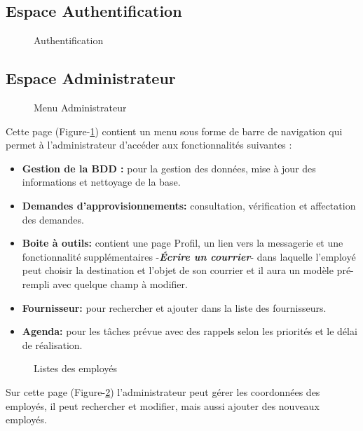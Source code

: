 \documentclass{report}
\begin{document}
\subsection{Espace Authentification}

\begin{figure}[h]
        \centering
        \caption{Authentification}
\end{figure}


\newpage
\subsection{Espace Administrateur}
\begin{figure}[h]
        \centering
        \caption{Menu Administrateur}
        \label{1}
\end{figure}
\vspace{1cm}
Cette page (Figure-\ref{1}) contient un menu sous forme de barre de navigation qui permet à l’administrateur d’accéder aux fonctionnalités suivantes :\\
\begin{itemize}
    \item \textbf{Gestion de la BDD :} pour la gestion des données, mise à jour des informations et nettoyage de la base.\\
    \item \textbf{Demandes d'approvisionnements:} consultation, vérification et affectation des demandes.\\
    \item \textbf{Boite à outils:} contient une page Profil, un lien vers la messagerie et une fonctionnalité supplémentaires -\textbf{\emph{Écrire un courrier}}- dans laquelle l’employé peut choisir la destination et l’objet de son courrier et il aura un modèle pré-rempli avec quelque champ à modifier.\\
    \item \textbf{Fournisseur:} pour rechercher et ajouter dans la liste des fournisseurs.\\
    \item \textbf{Agenda:} pour les tâches prévue avec des rappels selon les priorités et le délai de réalisation.\\
\end{itemize}

\newpage
\begin{figure}[h]
        \centering
        \caption{Listes des employés}
        \label{2}
\end{figure}
Sur cette page (Figure-\ref{2}) l'administrateur peut gérer les coordonnées des employés, il peut rechercher et modifier, mais aussi ajouter des nouveaux employés.
\vspace{1.5cm}
\end{document}
